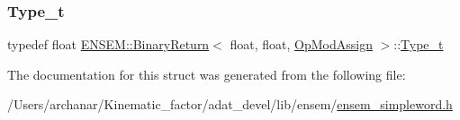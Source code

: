 \mbox{\label{structENSEM_1_1BinaryReturn_3_01float_00_01float_00_01OpModAssign_01_4_ae702556f8b6bcd0be5c8369133fc5c95}} 
\subsubsection{\texorpdfstring{Type\_t}{Type\_t}\hspace{0.1cm}{\footnotesize\ttfamily [2/2]}}
{\footnotesize\ttfamily typedef float \mbox{\hyperlink{structENSEM_1_1BinaryReturn}{E\+N\+S\+E\+M\+::\+Binary\+Return}}$<$ float, float, \mbox{\hyperlink{structENSEM_1_1OpModAssign}{Op\+Mod\+Assign}} $>$\+::\mbox{\hyperlink{structENSEM_1_1BinaryReturn_3_01float_00_01float_00_01OpModAssign_01_4_ae702556f8b6bcd0be5c8369133fc5c95}{Type\+\_\+t}}}



The documentation for this struct was generated from the following file\+:\begin{DoxyCompactItemize}
\item 
/\+Users/archanar/\+Kinematic\+\_\+factor/adat\+\_\+devel/lib/ensem/\mbox{\hyperlink{lib_2ensem_2ensem__simpleword_8h}{ensem\+\_\+simpleword.\+h}}\end{DoxyCompactItemize}
